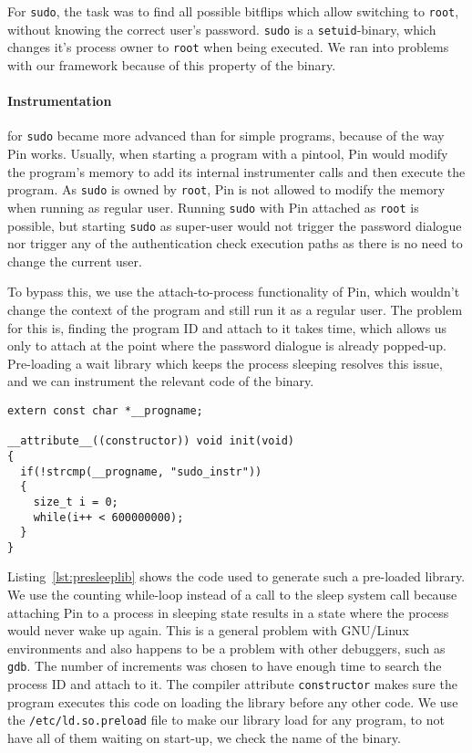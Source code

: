 For \texttt{sudo}, the task was to find all possible bitflips which allow
switching to \texttt{root}, without knowing the correct user's password.
\texttt{sudo} is a \texttt{setuid}-binary, which changes it's process owner to
\texttt{root} when being executed. We ran into problems with our framework
because of this property of the binary.

\paragraph{Instrumentation} for \texttt{sudo} became more advanced than for
simple programs, because of the way Pin works. Usually, when starting a program
with a pintool, Pin would modify the program's memory to add its internal
instrumenter calls and then execute the program. As \texttt{sudo} is owned by
\texttt{root}, Pin is not allowed to modify the memory when running as regular
user. Running \texttt{sudo} with Pin attached as \texttt{root} is possible, but
starting \texttt{sudo} as super-user would not trigger the password dialogue nor
trigger any of the authentication check execution paths as there is no need to
change the current user.

To bypass this, we use the attach-to-process functionality of Pin, which
wouldn't change the context of the program and still run it as a regular user.
The problem for this is, finding the program ID and attach to it takes time,
which allows us only to attach at the point where the password dialogue is
already popped-up. Pre-loading a wait library which keeps the process sleeping
resolves this issue, and we can instrument the relevant code of the binary.

\begin{minipage}{\linewidth}
\begin{lstlisting}[style=CStyle,
                   caption={Code of the pre-loaded library to keep the process
waiting for some milliseconds, which gives enough time for Pin to attach to the
process.},
label=lst:presleeplib]
extern const char *__progname;

__attribute__((constructor)) void init(void)
{
  if(!strcmp(__progname, "sudo_instr"))
  {
    size_t i = 0;
    while(i++ < 600000000);
  }
}
\end{lstlisting}
\end{minipage}

Listing~\ref{lst:presleeplib} shows the code used to generate such a pre-loaded
library. We use the counting while-loop instead of a call to the sleep system
call because attaching Pin to a process in sleeping state results in a state
where the process would never wake up again. This is a general problem with
GNU/Linux environments and also happens to be a problem with other debuggers,
such as \texttt{gdb}. The number of increments was chosen to have enough time to
search the process ID and attach to it. The compiler attribute
\texttt{constructor} makes sure the program executes this code on loading the
library before any other code. We use the \texttt{/etc/ld.so.preload} file to
make our library load for any program, to not have all of them waiting on
start-up, we check the name of the binary.

